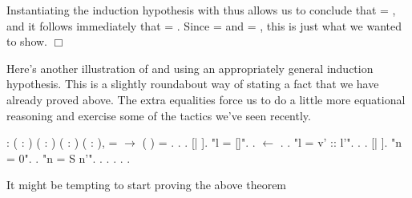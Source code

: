 \documentclass[12pt]{report}
\begin{document}
\begin{itemize}
    Instantiating the induction hypothesis with  thus allows us to
    conclude that  = , and it follows immediately that   = 
    .  Since   =  and   = , this is just what we wanted
    to show. \ensuremath{\Box} 
\end{itemize}


 Here's another illustration of  and using an
    appropriately general induction hypothesis.  This is a slightly
    roundabout way of stating a fact that we have already proved
    above.  The extra equalities force us to do a little more
    equational reasoning and exercise some of the tactics we've seen
    recently. \begin{coqdoccode}
\coqdocemptyline
\coqdocnoindent
{}  : \coqdockw{\ensuremath{\forall}} ( : ) ( : )\coqdoceol
\coqdocindent{15.00em}
( :  ) ( : ),\coqdoceol
\coqdocindent{2.50em}
  =  \ensuremath{\rightarrow}\coqdoceol
\coqdocindent{2.50em}
 (  ) =  .\coqdoceol
\coqdocnoindent
{}.\coqdoceol
\coqdocindent{1.00em}
   .    [|  ].\coqdoceol
\coqdocemptyline
\coqdocindent{1.00em}
 "l = []".\coqdoceol
\coqdocindent{2.00em}
  .  \ensuremath{\leftarrow} . .\coqdoceol
\coqdocemptyline
\coqdocindent{1.00em}
 "l = v' :: l'".\coqdoceol
\coqdocindent{2.00em}
  . .    [| ].\coqdoceol
\coqdocindent{2.00em}
 "n = 0".  .\coqdoceol
\coqdocindent{2.00em}
 "n = S n'".\coqdoceol
\coqdocindent{3.00em}
 .  .  . . .\coqdoceol
\coqdocemptyline
\end{coqdoccode}
It might be tempting to start proving the above theorem
\end{document}
